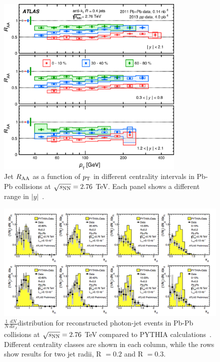 \begin{figure}[!ht]
  \centering
  \includegraphics[width=9cm]{FigCap1/ATLASjetsRaa.png}
  \caption{Jet $R_{\rm AA}$ as a function of $p_{\rm T}$ in different centrality
intervals in Pb-Pb collisions at $\sqrt{s_{\rm NN}} = 2.76$ TeV. Each panel shows a different range in $|y|$~\cite{Aad:2014bxa}.}
  \label{fig:ATLASjetsRaa}
\end{figure}
\begin{figure}[!ht]
  \centering
  \includegraphics[width=15cm]{FigCap1/ATLASdiijetGammaZ.png}
  \caption{$\frac{1}{N}\frac{dN}{dx_J}$distribution for reconstructed photon-jet events in Pb-Pb collisions at $\sqrt{s_{\rm NN}} = 2.76$ TeV compared to PYTHIA calculations~\cite{ATLAS-CONF-2012-121}. Different centrality classes are shown in each column, while the rows show results for two jet radii, R $= 0.2$ and R $=0.3$.}
  \label{fig:ATLASdijetAsymm}
\end{figure} 

